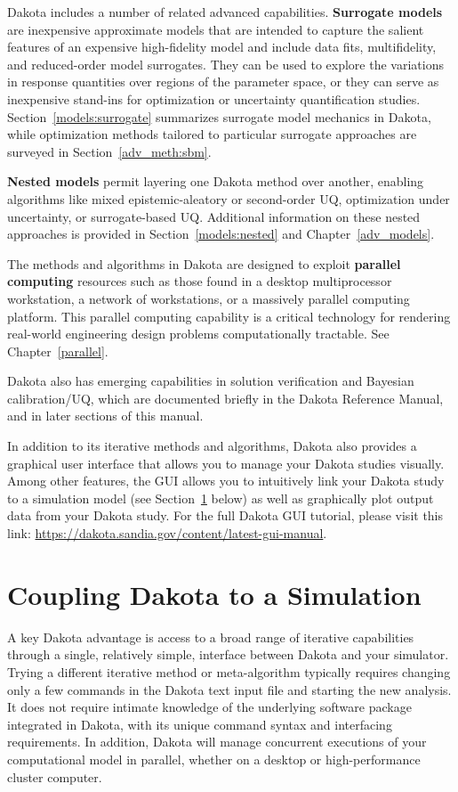 Dakota includes a number of related advanced capabilities. {\bf
  Surrogate models} are inexpensive approximate models that are
intended to capture the salient features of an expensive high-fidelity
model and include data fits, multifidelity, and reduced-order model
surrogates. They can be used to explore the variations in response
quantities over regions of the parameter space, or they can serve as
inexpensive stand-ins for optimization or uncertainty quantification
studies. Section~\ref{models:surrogate} summarizes surrogate model
mechanics in Dakota, while optimization methods tailored to particular
surrogate approaches are surveyed in Section~\ref{adv_meth:sbm}.

{\bf Nested models} permit layering one Dakota method over another,
enabling algorithms like mixed epistemic-aleatory or second-order UQ,
optimization under uncertainty, or surrogate-based UQ. Additional
information on these nested approaches is provided in
Section~\ref{models:nested} and Chapter~\ref{adv_models}.

The methods and algorithms in Dakota are designed to exploit {\bf
  parallel computing} resources such as those found in a desktop
multiprocessor workstation, a network of workstations, or a massively
parallel computing platform. This parallel computing capability is a
critical technology for rendering real-world engineering design
problems computationally tractable. See Chapter~\ref{parallel}.

Dakota also has emerging capabilities in solution verification and
Bayesian calibration/UQ, which are documented briefly in the Dakota
Reference Manual, and in later sections of this manual.

In addition to its iterative methods and algorithms, Dakota also 
provides a graphical user interface that allows you to manage your 
Dakota studies visually.  Among other features, the GUI allows you 
to intuitively link your Dakota study to a simulation model (see 
Section~\ref{intro:coupling} below) as well as graphically plot 
output data from your Dakota study.  For the full Dakota GUI tutorial, 
please visit this link:  
\url{https://dakota.sandia.gov/content/latest-gui-manual}.

\section{Coupling Dakota to a Simulation}\label{intro:coupling}

A key Dakota advantage is access to a broad range of iterative
capabilities through a single, relatively simple, interface between Dakota
and your simulator. Trying a different iterative method or meta-algorithm
typically requires changing only a few commands in the Dakota text
input file and starting the new analysis. It does not require intimate
knowledge of the underlying software package integrated in Dakota, with
its unique command syntax and interfacing requirements.  In addition,
Dakota will manage concurrent executions of your computational model in
parallel, whether on a desktop or high-performance cluster computer.


